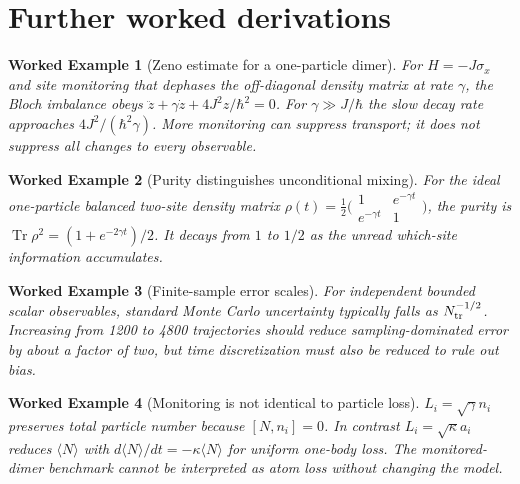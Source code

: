 \documentclass[11pt,a4paper]{article}
\newtheorem{example}{Worked Example}\newtheorem{remark}{Qualification}\newtheorem{proposition}{Proposition}
\newcommand{\tr}{\operatorname{Tr}}\newcommand{\D}{\mathcal D}\newcommand{\ket}[1]{|#1\rangle}\newcommand{\bra}[1]{\langle#1|}\newcommand{\E}{\mathbb E}\newcommand{\ip}[2]{\langle#1|#2\rangle}
\begin{document}
\section{Further worked derivations}
\begin{example}[Zeno estimate for a one-particle dimer]
For $H=-J\sigma_x$ and site monitoring that dephases the off-diagonal density matrix at rate $\gamma$, the Bloch imbalance obeys $\ddot z+\gamma\dot z+4J^2z/\hbar^2=0$. For $\gamma\gg J/\hbar$ the slow decay rate approaches $4J^2/(\hbar^2\gamma)$. More monitoring can suppress transport; it does not suppress all changes to every observable.
\end{example}
\begin{example}[Purity distinguishes unconditional mixing]
For the ideal one-particle balanced two-site density matrix $\rho(t)=\tfrac12\bigl(\begin{smallmatrix}1&e^{-\gamma t}\\e^{-\gamma t}&1\end{smallmatrix}\bigr)$, the purity is $\tr\rho^2=(1+e^{-2\gamma t})/2$. It decays from $1$ to $1/2$ as the unread which-site information accumulates.
\end{example}
\begin{example}[Finite-sample error scales]
For independent bounded scalar observables, standard Monte Carlo uncertainty typically falls as $N_{\rm tr}^{-1/2}$. Increasing from 1200 to 4800 trajectories should reduce sampling-dominated error by about a factor of two, but time discretization must also be reduced to rule out bias.
\end{example}
\begin{example}[Monitoring is not identical to particle loss]
$L_i=\sqrt\gamma n_i$ preserves total particle number because $[N,n_i]=0$. In contrast $L_i=\sqrt\kappa a_i$ reduces $\langle N\rangle$ with $d\langle N\rangle/dt=-\kappa\langle N\rangle$ for uniform one-body loss. The monitored-dimer benchmark cannot be interpreted as atom loss without changing the model.
\end{example}
\end{document}
